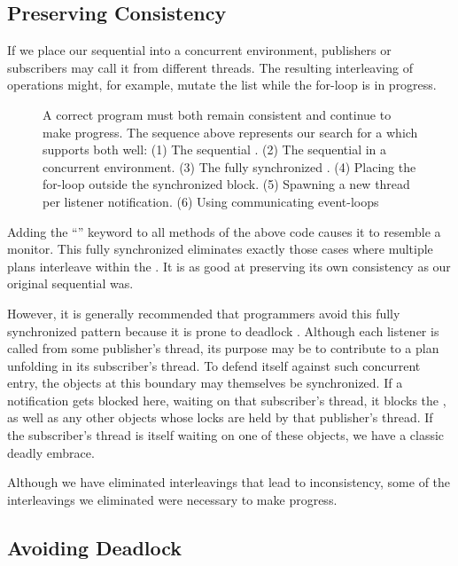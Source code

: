 \documentclass{llncs}
\begin{document}
\subsection{Preserving Consistency}

If we place our sequential  into a concurrent
environment, publishers or subscribers may call it from different
threads. The resulting interleaving of operations might, for example,
mutate the  list while the for-loop is in progress.

\begin{figure}
\centerline{}
\caption{A correct program must both remain consistent and continue to
make progress. The sequence above represents our search for a
 which supports both well:
(1) The sequential . 
(2) The sequential  in a concurrent environment.
(3) The fully synchronized .
(4) Placing the for-loop outside the synchronized block.
(5) Spawning a new thread per listener notification.
(6) Using communicating event-loops}
\label{fig:seesaw}
\end{figure}

Adding the ``'' keyword to all methods of the above
code causes it to resemble a monitor. This fully synchronized
 eliminates exactly those cases where multiple
plans interleave within the . It is as good at
preserving its own consistency as our original sequential
 was.

However, it is generally recommended that  programmers avoid
this fully synchronized pattern because it is prone to deadlock
\cite{Englander:beans}. Although each listener is called from some
publisher's thread, its purpose may be to contribute to a plan
unfolding in its subscriber's thread. To defend itself against such
concurrent entry, the objects at this boundary may themselves be
synchronized. If a  notification gets blocked
here, waiting on that subscriber's thread, it blocks the
, as well as any other objects whose locks are held
by that publisher's thread. If the subscriber's thread is itself
waiting on one of these objects, we have a classic deadly embrace.

Although we have eliminated interleavings that lead to inconsistency,
some of the interleavings we eliminated were necessary to make
progress.

\subsection{Avoiding Deadlock}
\end{document}
